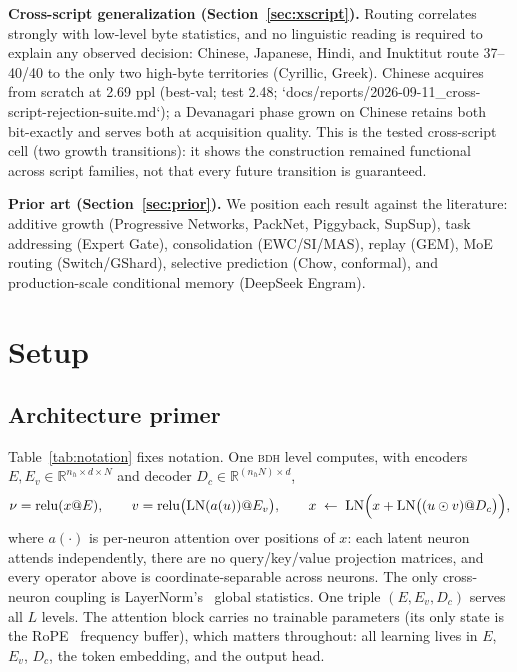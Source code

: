 \documentclass[11pt]{article}
\theoremstyle{definition}\newtheorem{definition}{Definition}
\theoremstyle{remark}\newtheorem{remark}{Remark}
\newcommand{\BDH}{\textsc{bdh}}
\begin{document}
\textbf{Cross-script generalization (Section~\ref{sec:xscript}).} Routing correlates strongly with low-level byte statistics, and no linguistic reading is required to explain any observed decision: Chinese, Japanese, Hindi, and Inuktitut route 37--40/40 to the only two high-byte territories (Cyrillic, Greek). Chinese acquires from scratch at 2.69 ppl (best-val; test 2.48; `docs/reports/2026-09-11\_cross-script-rejection-suite.md`); a Devanagari phase grown on Chinese retains both bit-exactly and serves both at acquisition quality. This is the tested cross-script cell (two growth transitions): it shows the construction remained functional across script families, not that every future transition is guaranteed.

\textbf{Prior art (Section~\ref{sec:prior}).} We position each result against the literature: additive growth (Progressive Networks, PackNet, Piggyback, SupSup), task addressing (Expert Gate), consolidation (EWC/SI/MAS), replay (GEM), MoE routing (Switch/GShard), selective prediction (Chow, conformal), and production-scale conditional memory (DeepSeek Engram).

\section{Setup}
\label{sec:setup}

\subsection{Architecture primer}\label{sec:primer}

Table~\ref{tab:notation} fixes notation. One \BDH{} level computes, with encoders
$E,E_v\in\mathbb{R}^{n_h\times d\times N}$ and decoder $D_c\in\mathbb{R}^{(n_hN)\times d}$,
\[
\nu=\operatorname{relu}(x@E),\qquad
v=\operatorname{relu}\bigl(\operatorname{LN}(a(u))@E_v\bigr),\qquad
x \;\leftarrow\; \operatorname{LN}\Bigl(x+\operatorname{LN}\bigl((u\odot v)@D_c\bigr)\Bigr),
\]
where $a(\cdot)$ is per-neuron attention over positions of $x$: each latent neuron attends
independently, there are no query/key/value projection matrices, and every operator above is
coordinate-separable across neurons. The only cross-neuron coupling is LayerNorm's~\cite{layernorm} global
statistics. One triple $(E,E_v,D_c)$ serves all $L$ levels. The attention block carries no
trainable parameters (its only state is the RoPE~\cite{rope} frequency buffer), which matters throughout:
all learning lives in $E$, $E_v$, $D_c$, the token embedding, and the output head.
\end{document}
